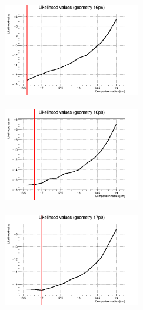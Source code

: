 \documentclass[a4paper, 11pt]{report}
\begin{document}
\begin{figure}[htbp]
\centering
\begin{minipage}[b]{.32\textwidth}
\includegraphics[width=6cm, height=4.6cm]{figs/likelihood100LowStat/likelihood16p6.png}
\end{minipage}\hfill
\begin{minipage}[b]{.32\textwidth}
\includegraphics[width=6cm, height=4.6cm]{figs/likelihood100LowStat/likelihood16p8.png}
\end{minipage} \hfill
\begin{minipage}[b]{.32\textwidth}
\includegraphics[width=6cm, height=4.6cm]{figs/likelihood100LowStat/likelihood17p0.png}
\end{minipage} \hfill \vspace{10pt}


\end{figure}
\end{document}
